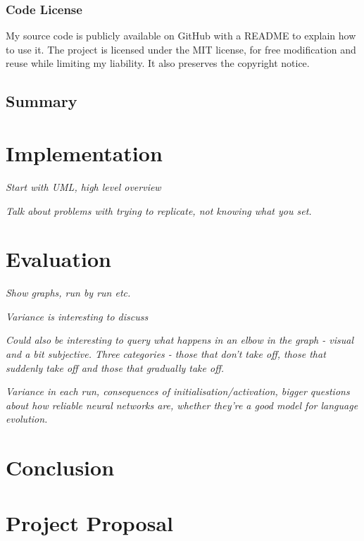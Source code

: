\documentclass[12pt,a4paper,twoside,openright]{report}
\begin{document}
\subsection{Code License}

My source code is publicly available on GitHub with a README to explain how to use it. The project is licensed under the MIT license, for free modification and reuse while limiting my liability. It also preserves the copyright notice.

\section{Summary}\label{section:summary}


\chapter{Implementation}

\emph{Start with UML, high level overview}

\emph{Talk about problems with trying to replicate, not knowing what you set.}


\chapter{Evaluation}

\emph{Show graphs, run by run etc.}

\emph{Variance is interesting to discuss}

\emph{Could also be interesting to query what happens in an elbow in the graph - visual and a bit subjective. Three categories - those that don't take off, those that suddenly take off and those that gradually take off.}

\emph{Variance in each run, consequences of initialisation/activation, bigger questions about how reliable neural networks are, whether they're a good model for language evolution. }


\chapter{Conclusion}




\appendix

\chapter{Project Proposal}


\end{document}
